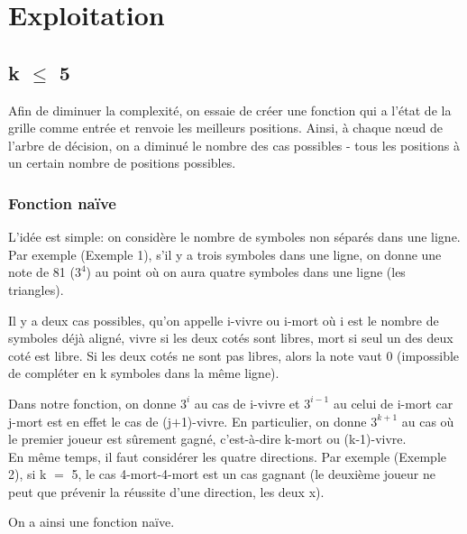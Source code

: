 \documentclass[12pt, a4paper]{article}
\begin{document}
\section{Exploitation}
\subsection{k $\le$ 5}
Afin de diminuer la complexité, on essaie de créer une fonction qui a l'état de la grille comme entrée et renvoie les meilleurs positions. Ainsi, à chaque nœud de l'arbre de décision, on a diminué le nombre des cas possibles - tous les positions à un certain nombre de positions possibles.
\subsubsection{Fonction naïve}
L'idée est simple: on considère le nombre de symboles non séparés dans une ligne. Par exemple (Exemple 1), s'il y a trois symboles dans une ligne, on donne une note de 81 ($3^{4}$) au point où on aura quatre symboles dans une ligne (les triangles).
\begin{center}
\end{center}
Il y a deux cas possibles, qu'on appelle i-vivre ou i-mort où i est le nombre de symboles déjà aligné, vivre si les deux cotés sont libres, mort si seul un des deux coté est libre. Si les deux cotés ne sont pas libres, alors la note vaut 0 (impossible de compléter en k symboles dans la même ligne).
\begin{center}
\end{center}
\begin{center}
\end{center}
Dans notre fonction, on donne $3^{i}$ au cas de i-vivre et $3^{i-1}$ au celui de i-mort car j-mort est en effet le cas de (j$+$1)-vivre. En particulier, on donne $3^{k+1}$ au cas où le premier joueur est sûrement gagné, c'est-à-dire k-mort ou (k-1)-vivre.\\
En même temps, il faut considérer les quatre directions. Par exemple (Exemple 2), si k $=$ 5, le cas 4-mort-4-mort est un cas gagnant (le deuxième joueur ne peut que prévenir la réussite d'une direction, les deux x).
\cleargoban
\begin{center}
\end{center}
On a ainsi une fonction naïve.
\end{document}
